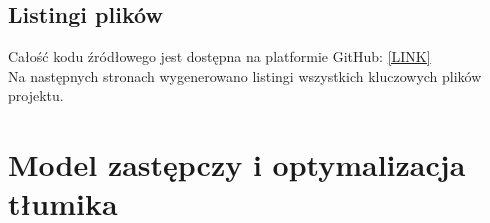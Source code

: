\documentclass{sprawozdanie-agh}
\begin{document}
\subsection{Listingi plików}
Całość kodu źródłowego jest dostępna na platformie GitHub: \href{https://github.com/alexxior/fem-muffler}{[LINK]}\\Na następnych stronach wygenerowano listingi wszystkich kluczowych plików projektu.
\newpage
\label{list1}
\label{list5}
\newpage
\label{list2}
\label{list3}
\label{list4}
\label{list7}
\label{list8}
\label{list6}
\label{list9}
\label{list10}
\newpage
\section{Model zastępczy i optymalizacja tłumika}
\end{document}
